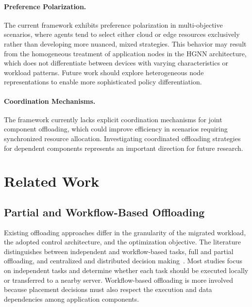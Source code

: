 \paragraph{Preference Polarization.}
The current framework exhibits preference polarization in multi-objective scenarios, 
 where agents tend to select either cloud or edge resources exclusively rather than developing more nuanced, mixed strategies. 
 This behavior may result from the homogeneous treatment of application nodes in the \gls{HGNN} architecture,
 which does not differentiate between devices with varying characteristics or workload patterns.
%
Future work should explore heterogeneous node representations to enable more sophisticated policy differentiation.


\paragraph{Coordination Mechanisms.}
The framework currently lacks explicit coordination mechanisms for joint component offloading, 
 which could improve efficiency in scenarios requiring synchronized resource allocation.
%
Investigating coordinated offloading strategies for dependent components represents an important direction for future research.


\section{Related Work}
\label{sec:related-works}

\subsection{Partial and Workflow-Based Offloading}

Existing offloading approaches differ in the granularity of the migrated workload,
the adopted control architecture, and the optimization objective.
The literature distinguishes between independent and workflow-based tasks, full
and partial offloading, and centralized and distributed decision
making~\cite{DBLP:journals/access/WangWHSQ20}.
Most studies focus on independent tasks and determine whether each task should be
executed locally or transferred to a nearby server.
Workflow-based offloading is more involved because placement decisions must also
respect the execution and data dependencies among application components.

